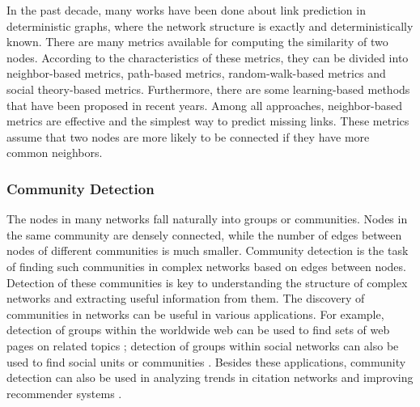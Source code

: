 \documentclass[\main/thesis.tex]{subfiles}
\begin{document}
In the past decade, many works have been done about link prediction in deterministic graphs, where the network structure is exactly and deterministically known. There are many metrics available for computing the similarity of two nodes. According to the characteristics of these metrics, they can be divided into neighbor-based metrics, path-based metrics, random-walk-based metrics and social theory-based metrics. Furthermore, there are some learning-based methods that have been proposed in recent years. Among all approaches, neighbor-based metrics are effective and the simplest way to predict missing links. These metrics assume that two nodes are more likely to be connected if they have more common neighbors. %

\subsubsection{Community Detection}
The nodes in many networks fall naturally into groups or communities. Nodes in the same community are densely connected, while the number of edges between nodes of different communities is much smaller. Community detection is the task of finding such communities in complex networks based on edges between nodes. Detection of these communities is key to understanding the structure of complex networks and extracting useful information from them. The discovery of communities in networks can be useful in various applications. For example, detection of groups within the worldwide web can be used to find sets of web pages on related topics \cite{flake2002self}; detection of groups within social networks can also be used to find social units or communities \cite{girvan2002community}. Besides these applications, community detection can also be used in analyzing trends in citation networks \cite{bedi2016community} and improving recommender systems \cite{cao2015improved}. 
\end{document}
